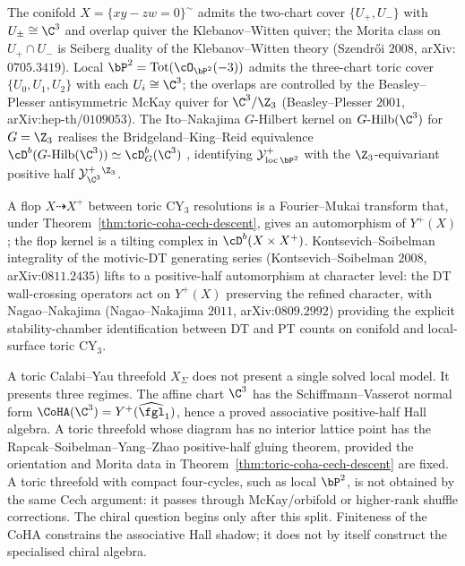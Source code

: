\begin{remark}
\label{rem:toric-coha-gluing-examples}
The conifold $X = \{xy - zw = 0\}^\sim$ admits the two-chart cover $\{U_+, U_-\}$ with $U_\pm \cong \C^3$ and overlap quiver the Klebanov--Witten quiver; the Morita class on $U_+ \cap U_-$ is Seiberg duality of the Klebanov--Witten theory (Szendr\H{o}i $2008$, arXiv:$0705.3419$). Local $\bP^2 = \mathrm{Tot}(\cO_{\bP^2}(-3))$ admits the three-chart toric cover $\{U_0, U_1, U_2\}$ with each $U_i \cong \C^3$; the overlaps are controlled by the Beasley--Plesser antisymmetric McKay quiver for $\C^3 / \Z_3$ (Beasley--Plesser $2001$, arXiv:hep-th/$0109053$). The Ito--Nakajima $G$-Hilbert kernel on $G\text{-}\mathrm{Hilb}(\C^3)$ for $G = \Z_3$ realises the Bridgeland--King--Reid equivalence $\cD^b(G\text{-}\mathrm{Hilb}(\C^3)) \simeq \cD^b_G(\C^3)$ \cite{BridgelandKingReid2001}, identifying $\cY^+_{\mathrm{loc}\,\bP^2}$ with the $\Z_3$-equivariant positive half $\cY^+_{\C^3}{}^{\Z_3}$.
\end{remark}

\begin{remark}
\label{rem:toric-coha-flop-ks}
A flop $X \dashrightarrow X^+$ between toric $\mathrm{CY}_3$ resolutions is a Fourier--Mukai transform \cite{BridgelandKingReid2001} that, under Theorem~\ref{thm:toric-coha-cech-descent}, gives an automorphism of $Y^+(X)$; the flop kernel is a tilting complex in $\cD^b(X \times X^+)$. Kontsevich--Soibelman integrality of the motivic-DT generating series (Kontsevich--Soibelman $2008$, arXiv:$0811.2435$) lifts to a positive-half automorphism at character level: the DT wall-crossing operators act on $Y^+(X)$ preserving the refined character, with Nagao--Nakajima (Nagao--Nakajima $2011$, arXiv:$0809.2992$) providing the explicit stability-chamber identification between DT and PT counts on conifold and local-surface toric $\mathrm{CY}_3$.
\end{remark}

A toric Calabi--Yau threefold $X_\Sigma$ does not present a single solved
local model. It presents three regimes. The affine chart $\C^3$ has the
Schiffmann--Vasserot normal form
$\CoHA(\C^3)=Y^+(\widehat{\fgl}_1)$, hence a proved associative
positive-half Hall algebra. A toric threefold whose diagram has no
interior lattice point has the Rapcak--Soibelman--Yang--Zhao
positive-half gluing theorem, provided the orientation and Morita data in
Theorem~\ref{thm:toric-coha-cech-descent} are fixed. A toric threefold
with compact four-cycles, such as local $\bP^2$, is not obtained by the
same Cech argument: it passes through McKay/orbifold or higher-rank
shuffle corrections. The chiral question begins only after this split.
Finiteness of the CoHA constrains the associative Hall shadow; it does
not by itself construct the specialised chiral algebra.

